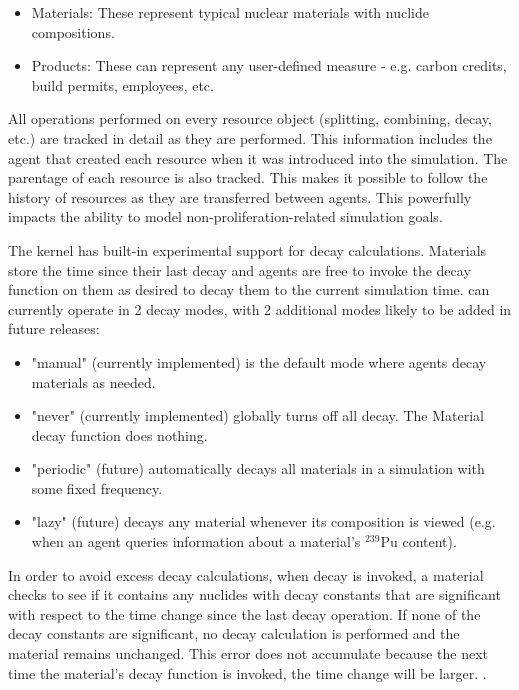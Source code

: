 \begin{itemize}

  \item Materials: These represent typical nuclear materials with
      nuclide compositions.

  \item Products: These can represent any user-defined measure - e.g. carbon
      credits, build permits, employees, etc.

\end{itemize}

All operations performed on every resource object (splitting, combining,
decay, etc.) are tracked in detail as they are performed.  This information
includes the agent that created each resource when it was introduced into the
simulation.  The parentage of each resource is also tracked. This makes it
possible to follow the history of resources as they are transferred between
agents.  This powerfully impacts the ability to model
non-proliferation-related simulation goals.

The \Cyclus kernel has built-in experimental support for decay calculations.
Materials store the time since their last decay and agents are free to
invoke the decay function on them as desired to decay them to the current
simulation time. \Cyclus can currently operate in 2 decay modes, with 2 additional
modes likely to be added in future releases:

\begin{itemize}

    \item "manual" (currently implemented) is the default mode
        where agents decay materials as needed.

    \item "never" (currently implemented) globally turns off all decay.
        The Material decay function does nothing.

    \item "periodic" (future) automatically decays all materials in a
        simulation with some fixed frequency.

    \item "lazy" (future) decays any material whenever its composition is
        viewed (e.g. when an agent queries information about a material's
        $^{239}$Pu content).

\end{itemize}

In order to avoid excess decay calculations, when decay
is invoked, a material checks to see if it contains any nuclides with decay
constants that are significant with respect to the time change since the last
decay operation.  If none of the decay constants are significant, no decay
calculation is performed and the material remains unchanged.  This error does
not accumulate because the next time the material's decay function is invoked,
the time change will be larger. 
.

